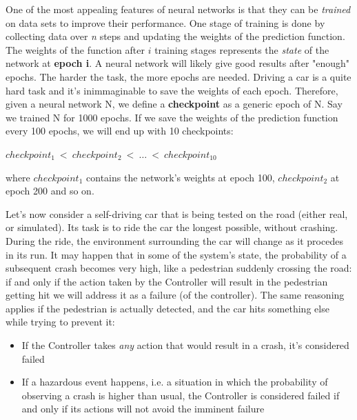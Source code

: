 One of the most appealing features of neural networks is that they can be \textsl{trained} on data sets to improve their performance. One stage of training is done by collecting data over \textsl{n} steps and updating the weights of the prediction function. The weights of the function after $i$ training stages represents the \textsl{state} of the network at \textbf{epoch i}.\newline
A neural network will likely give good results after "enough" epochs. The harder the task, the more epochs are needed. Driving a car is a quite hard task and it's inimmaginable to save the weights of each epoch. Therefore, given a neural network N, we define a \textbf{checkpoint} as a generic epoch of N. Say we trained N for 1000 epochs. If we save the weights of the prediction function every 100 epochs, we will end up with 10 checkpoints:

\begin{center}
	$checkpoint_{1}\: <\: checkpoint_{2}\: <\: \dots \:<\: checkpoint_{10}$
\end{center}

where $checkpoint_{1}$ contains the network's weights at epoch 100, $checkpoint_{2}$ at epoch 200 and so on.\newline

Let's now consider a self-driving car that is being tested on the road (either real, or simulated). Its task is to ride the car the longest possible, without crashing. During the ride, the environment surrounding the car will change as it procedes in its run. It may happen that in some of the system's state, the probability of a subsequent crash becomes very high, like a pedestrian suddenly crossing the road: if and only if the action taken by the Controller will result in the pedestrian getting hit we will address it as a failure (of the controller). The same reasoning applies if the pedestrian is actually detected, and the car hits something else while trying to prevent it:

\begin{itemize}
	\item If the Controller takes \textsl{any} action that would result in a crash, it's considered failed
	\item If a hazardous event happens, i.e. a situation in which the probability of observing a crash is higher than usual, the Controller is considered failed if and only if its actions will not avoid the imminent failure
\end{itemize}

